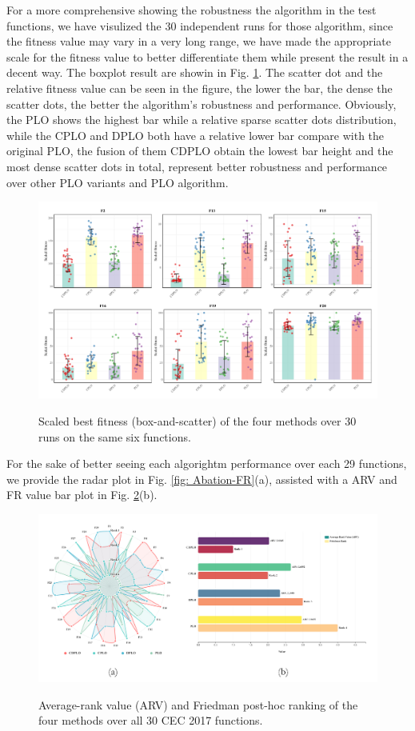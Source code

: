 \documentclass[3p]{elsarticle}
\begin{document}
For a more comprehensive showing the robustness the algorithm in the test functions, we have visulized the 30 independent runs for those algorithm, since the fitness value may vary in a very long range, we have made the appropriate scale for the fitness value to better differentiate them while present the result in a decent way. The boxplot result are showin in Fig. \ref{fig: CDPLO-Ablation-boxplot}. The scatter dot and the relative fitness value can be seen in the figure, the lower the bar, the dense the scatter dots, the better the algorithm's robustness and performance. Obviously, the PLO shows the highest bar while a relative sparse scatter dots distribution, while the CPLO and DPLO both have a relative lower bar compare with the original PLO, the fusion of them CDPLO obtain the lowest bar height and the most dense scatter dots in total, represent better robustness and performance over other PLO variants and PLO algorithm. 

 \begin{figure}
\centering
\caption{Scaled best fitness (box-and-scatter) of the four
           methods over 30 runs on the same six functions.}
\includegraphics[width=\linewidth]{CDPLO-Ablation-boxplot}
\label{fig: CDPLO-Ablation-boxplot}
\end{figure}

For the sake of better seeing each algorightm performance over each 29 functions, we provide the radar plot in Fig. \ref{fig: Abation-FR}(a), assisted with a ARV and FR value bar plot in Fig. \ref{fig: Ablation-FR}(b).

\begin{figure}
\centering
\caption{Average-rank value (ARV) and Friedman post-hoc ranking
           of the four methods over all 30 CEC 2017 functions.}
\includegraphics[width=\linewidth]{Ablation-FR}
\label{fig: Ablation-FR}
\end{figure}
\end{document}
